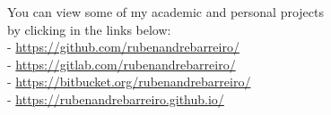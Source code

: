 \documentclass[10pt,a4paper,academicons]{altacv}
\begin{document}
\divider

{\footnotesize You can view some of my academic and personal projects\\
by clicking in the links below:\\
- \href{https://github.com/rubenandrebarreiro/}{https://github.com/rubenandrebarreiro/}\\
- \href{https://gitlab.com/rubenandrebarreiro/}{https://gitlab.com/rubenandrebarreiro/}\\
- \href{https://bitbucket.org/rubenandrebarreiro/}{https://bitbucket.org/rubenandrebarreiro/}\\
- \href{https://rubenandrebarreiro.github.io/}{https://rubenandrebarreiro.github.io/}\\
}

\divider

\clearpage

\end{document}

